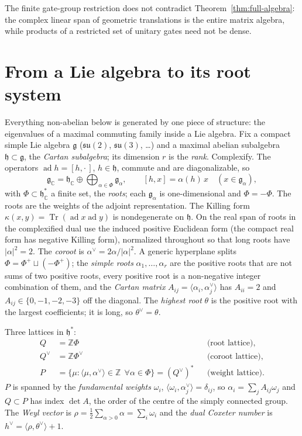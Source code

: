 \documentclass[11pt]{article}
\theoremstyle{definition}
\theoremstyle{remark}
\newcommand{\Z}{\mathbb{Z}}
\newcommand{\C}{\mathbb{C}}
\newcommand{\Tr}{\operatorname{Tr}}
\begin{document}
The finite gate-group restriction does not contradict
Theorem~\ref{thm:full-algebra}: the complex linear span of geometric
translations is the entire matrix algebra, while products of a restricted
set of unitary gates need not be dense.

\section{From a Lie algebra to its root system}\label{sec:lie}

Everything non-abelian below is generated by one piece of structure: the
eigenvalues of a maximal commuting family inside a Lie algebra. Fix a
compact simple Lie algebra $\mathfrak g$ ($\mathfrak{su}(2)$,
$\mathfrak{su}(3)$, \dots) and a maximal abelian subalgebra
$\mathfrak h\subset\mathfrak g$, the \emph{Cartan subalgebra}; its
dimension $r$ is the \emph{rank}. Complexify. The operators
$\operatorname{ad}h = [h,\cdot\,]$, $h\in\mathfrak h$, commute and are
diagonalizable, so
\[
  \mathfrak g_\C = \mathfrak h_\C\oplus\bigoplus_{\alpha\in\Phi}\mathfrak g_\alpha,
  \qquad [h,x] = \alpha(h)\,x \quad (x\in\mathfrak g_\alpha),
\]
with $\Phi\subset\mathfrak h_\C^*$ a finite set, the \emph{roots}; each
$\mathfrak g_\alpha$ is one-dimensional and $\Phi = -\Phi$. The roots are
the weights of the adjoint representation. The Killing form
$\kappa(x,y) = \Tr(\operatorname{ad}x\operatorname{ad}y)$ is nondegenerate
on $\mathfrak h$. On the real span of roots in the complexified dual use
the induced positive Euclidean form (the compact real form has negative
Killing form), normalized throughout so that long roots have
$|\alpha|^2 = 2$. The \emph{coroot} is $\alpha^\vee = 2\alpha/|\alpha|^2$.
A generic hyperplane splits $\Phi = \Phi^+\sqcup(-\Phi^+)$; the
\emph{simple roots} $\alpha_1,\dots,\alpha_r$ are the positive roots that
are not sums of two positive roots, every positive root is a non-negative
integer combination of them, and the \emph{Cartan matrix}
$A_{ij} = \langle\alpha_i,\alpha_j^\vee\rangle$ has $A_{ii} = 2$ and
$A_{ij}\in\{0,-1,-2,-3\}$ off the diagonal. The \emph{highest root}
$\theta$ is the positive root with the largest coefficients; it is long,
so $\theta^\vee = \theta$.

Three lattices in $\mathfrak h^*$:
\[
 \begin{aligned}
  Q &= \Z\Phi &&\text{(root lattice)},\\
  Q^\vee &= \Z\Phi^\vee &&\text{(coroot lattice)},\\
  P &= \{\mu : \langle\mu,\alpha^\vee\rangle\in\Z\ \ \forall\alpha\in\Phi\}
       =(Q^\vee)^* &&\text{(weight lattice)}.
 \end{aligned}
\]
$P$ is spanned by the \emph{fundamental weights} $\omega_i$,
$\langle\omega_i,\alpha_j^\vee\rangle = \delta_{ij}$, so
$\alpha_i = \sum_jA_{ij}\omega_j$ and $Q\subset P$ has index $\det A$, the
order of the centre of the simply connected group. The \emph{Weyl vector}
is $\rho = \tfrac12\sum_{\alpha>0}\alpha = \sum_i\omega_i$ and the
\emph{dual Coxeter number} is $h^\vee = \langle\rho,\theta^\vee\rangle+1$.
\end{document}

